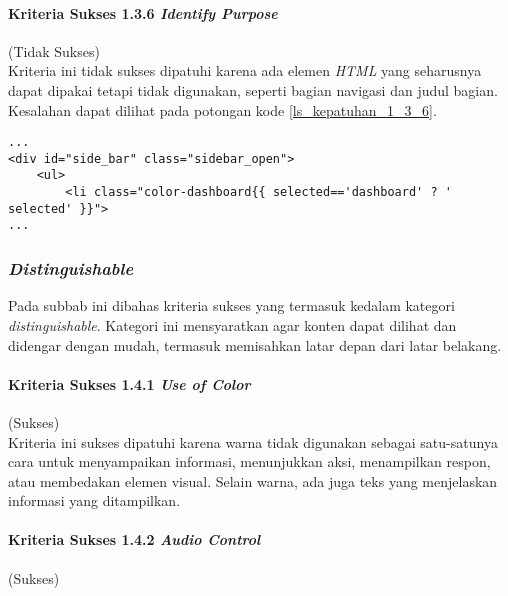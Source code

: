 \paragraph{Kriteria Sukses 1.3.6 \textit{Identify Purpose}}
\label{subsubsec:kepatuhan_kriteria_1.3.6}
(Tidak Sukses) \\

Kriteria ini tidak sukses dipatuhi karena ada elemen \textit{HTML} yang seharusnya dapat dipakai tetapi tidak digunakan, seperti bagian navigasi dan judul bagian. Kesalahan dapat dilihat pada potongan kode \ref{ls_kepatuhan_1_3_6}.
\begin{lstlisting}[basicstyle=\ttfamily, frame=single,
columns=fullflexible, keepspaces=true, breaklines=true, label=ls_kepatuhan_1_3_6, caption=Pelanggaran Kriteria Sukses 1.3.6 - \textit{Sidebar} Tidak Memakai \textit{Tag} \textit{Nav}]
...
<div id="side_bar" class="sidebar_open">
	<ul>
		<li class="color-dashboard{{ selected=='dashboard' ? ' selected' }}">
...
\end{lstlisting}

\subsubsection{\textit{Distinguishable}}
\label{subsubsec:distinguishable}

Pada subbab ini dibahas kriteria sukses yang termasuk kedalam kategori \textit{distinguishable}. Kategori ini mensyaratkan agar konten dapat dilihat dan didengar dengan mudah, termasuk memisahkan latar depan dari latar belakang.

\paragraph{Kriteria Sukses 1.4.1 \textit{Use of Color}}
\label{subsubsec:kepatuhan_kriteria_1.4.1}
(Sukses) \\

Kriteria ini sukses dipatuhi karena warna tidak digunakan sebagai satu-satunya cara untuk menyampaikan informasi, menunjukkan aksi, menampilkan respon, atau membedakan elemen visual. Selain warna, ada juga teks yang menjelaskan informasi yang ditampilkan.

\paragraph{Kriteria Sukses 1.4.2 \textit{Audio Control}}
\label{subsubsec:kepatuhan_kriteria_1.4.2}
(Sukses) \\

